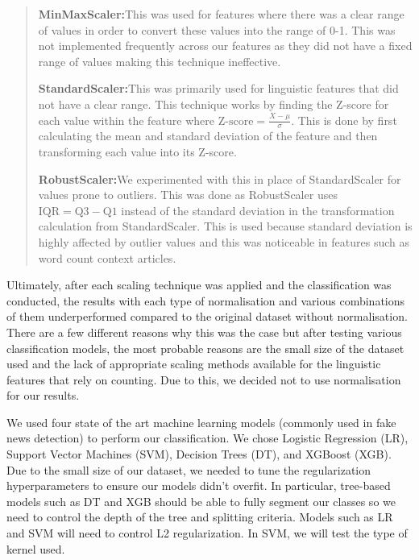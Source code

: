 \documentclass{article}
\begin{document}
\begin{quote}
  \textbf{MinMaxScaler:}\quad This was used for features where there was a clear range of values in order to convert these values into the range of 0-1. This was not implemented frequently across our features as they did not have a fixed range of values making this technique ineffective.

  \textbf{StandardScaler:}\quad This was primarily used for linguistic features that did not have a clear range. This technique works by finding the Z-score for each value within the feature where $\text{Z-score} = \frac{X - \mu}{\sigma}$. This is done by first calculating the mean and standard deviation of the feature and then transforming each value into its Z-score.

  \textbf{RobustScaler:}\quad We experimented with this in place of StandardScaler for values prone to outliers. This was done as RobustScaler uses $\text{IQR} = \text{Q3} - \text{Q1}$ instead of the standard deviation in the transformation calculation from StandardScaler. This is used because standard deviation is highly affected by outlier values and this was noticeable in features such as word count context articles.
\end{quote}

Ultimately, after each scaling technique was applied and the classification was conducted, the results with each type of normalisation and various combinations of them underperformed compared to the original dataset without normalisation. There are a few different reasons why this was the case but after testing various classification models, the most probable reasons are the small size of the dataset used and the lack of appropriate scaling methods available for the linguistic features that rely on counting. Due to this, we decided not to use normalisation for our results.



We used four state of the art machine learning models (commonly used in fake news detection) to perform our classification. We chose Logistic Regression (LR), Support Vector Machines (SVM), Decision Trees (DT), and XGBoost (XGB). Due to the small size of our dataset, we needed to tune the regularization hyperparameters to ensure our models didn't overfit. In particular, tree-based models such as DT and XGB should be able to fully segment our classes so we need to control the depth of the tree and splitting criteria. Models such as LR and SVM will need to control L2 regularization. In SVM, we will test the type of kernel used.
\end{document}
